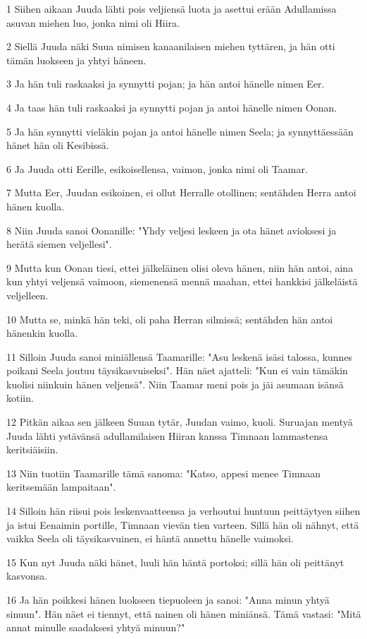 \par 1 Siihen aikaan Juuda lähti pois veljiensä luota ja asettui erään Adullamissa asuvan miehen luo, jonka nimi oli Hiira.
\par 2 Siellä Juuda näki Suua nimisen kanaanilaisen miehen tyttären, ja hän otti tämän luokseen ja yhtyi häneen.
\par 3 Ja hän tuli raskaaksi ja synnytti pojan; ja hän antoi hänelle nimen Eer.
\par 4 Ja taas hän tuli raskaaksi ja synnytti pojan ja antoi hänelle nimen Oonan.
\par 5 Ja hän synnytti vieläkin pojan ja antoi hänelle nimen Seela; ja synnyttäessään hänet hän oli Kesibissä.
\par 6 Ja Juuda otti Eerille, esikoisellensa, vaimon, jonka nimi oli Taamar.
\par 7 Mutta Eer, Juudan esikoinen, ei ollut Herralle otollinen; sentähden Herra antoi hänen kuolla.
\par 8 Niin Juuda sanoi Oonanille: "Yhdy veljesi leskeen ja ota hänet avioksesi ja herätä siemen veljellesi".
\par 9 Mutta kun Oonan tiesi, ettei jälkeläinen olisi oleva hänen, niin hän antoi, aina kun yhtyi veljensä vaimoon, siemenensä mennä maahan, ettei hankkisi jälkeläistä veljelleen.
\par 10 Mutta se, minkä hän teki, oli paha Herran silmissä; sentähden hän antoi hänenkin kuolla.
\par 11 Silloin Juuda sanoi miniällensä Taamarille: "Asu leskenä isäsi talossa, kunnes poikani Seela joutuu täysikasvuiseksi". Hän näet ajatteli: "Kun ei vain tämäkin kuolisi niinkuin hänen veljensä". Niin Taamar meni pois ja jäi asumaan isänsä kotiin.
\par 12 Pitkän aikaa sen jälkeen Suuan tytär, Juudan vaimo, kuoli. Suruajan mentyä Juuda lähti ystävänsä adullamilaisen Hiiran kanssa Timnaan lammastensa keritsiäisiin.
\par 13 Niin tuotiin Taamarille tämä sanoma: "Katso, appesi menee Timnaan keritsemään lampaitaan".
\par 14 Silloin hän riisui pois leskenvaatteensa ja verhoutui huntuun peittäytyen siihen ja istui Eenaimin portille, Timnaan vievän tien varteen. Sillä hän oli nähnyt, että vaikka Seela oli täysikasvuinen, ei häntä annettu hänelle vaimoksi.
\par 15 Kun nyt Juuda näki hänet, luuli hän häntä portoksi; sillä hän oli peittänyt kasvonsa.
\par 16 Ja hän poikkesi hänen luokseen tiepuoleen ja sanoi: "Anna minun yhtyä sinuun". Hän näet ei tiennyt, että nainen oli hänen miniänsä. Tämä vastasi: "Mitä annat minulle saadaksesi yhtyä minuun?"
